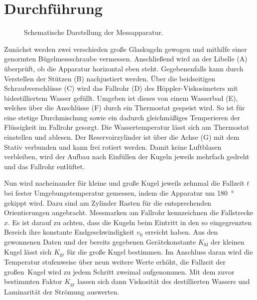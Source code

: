 \section{Durchführung}
\label{sec:durchführung}

\begin{figure}[H]
	\centering
	\vspace{1.23ex}
	\begin{tikzpicture}
		
	\end{tikzpicture}
	\vspace{1.23ex}
	\caption{Schematische Darstellung der Messapparatur.}
	\label{fig:apparat}
\end{figure}

Zunächst werden zwei verschieden große Glaskugeln gewogen und mithilfe einer genormten Bügelmessschraube vermessen.
Anschließend wird an der Libelle \small (A) \normalsize überprüft, ob die Apparatur horizontal eben steht.
Gegebenenfalls kann durch Verstellen der Stützen \small (B) \normalsize nachjustiert werden. Über die beidseitigen
Schraubverschlüsse \small (C) \normalsize wird das Fallrohr \small (D) \normalsize des
Höppler\hspace{0.15ex}-\hspace{-0.15ex}Viskosimeters mit bidestilliertem Wasser gefüllt. Umgeben ist dieses von einem
Wasserbad \small(E)\normalsize, welches über die Anschlüsse \small (F) \normalsize durch ein Thermostat gespeist wird.
So ist für eine stetige Durchmischung sowie ein dadurch gleichmäßiges Temperieren der Flüssigkeit im Fallrohr gesorgt.
Die Wassertemperatur lässt sich am Thermostat einstellen und ablesen. Der Reservoirzylinder ist über die
Achse \small (G) \normalsize mit dem Stativ verbunden und kann frei rotiert werden. Damit keine Luftblasen verbleiben,
wird der Aufbau nach Einfüllen der Kugeln jeweils mehrfach gedreht und das Fallrohr entlüftet. 

Nun wird nacheinander für kleine und große Kugel jeweils zehnmal die Fallzeit $t$ bei fester Umgebungstemperatur gemessen,
indem die Apparatur um \qty{180}{\degree} gekippt wird. Dazu sind am Zylinder Rasten für die entsprechenden Orientierungen
angebracht. Messmarken am Fallrohr kennzeichnen die Fallstrecke $x$. Es ist darauf zu achten, dass die Kugeln
beim Eintritt in den so eingegrenzten Bereich ihre konstante Endgeschwindigkeit $v_0$ erreicht haben. Aus den gewonnenen
Daten und der bereits gegebenen Gerätekonstante $K_\text{kl}$ der kleinen Kugel lässt sich $K_\text{gr}$ für die große Kugel
bestimmen. Im Anschluss daran wird die Temperatur stufenweise über neun weitere Werte erhöht, die Fallzeit der großen~Kugel
wird zu jedem Schritt zweimal aufgenommen. Mit dem zuvor bestimmten Faktor $K_\text{gr}$ lassen sich dann Viskosität des
destillierten Wassers und Laminarität der Strömung auswerten.
